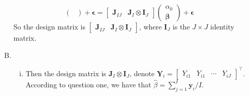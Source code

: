 \documentclass[12pt]{article}
\newcommand{\ttt}[1]{\textbf{#1}}
\begin{document}
\begin{enumerate}
\begin{enumerate}[A.]
$$\begin{pmatrix}
        \end{pmatrix} 
        + \bm{\epsilon}
        = \begin{bmatrix}
            \ttt{J}_{IJ} & \ttt{J}_I \otimes \ttt{I}_J
        \end{bmatrix}
        \begin{pmatrix}
            \alpha_0 \\
            \bm{\beta}
        \end{pmatrix} + \bm{\epsilon}
        $$
        So the design matrix is $\begin{bmatrix} \ttt{J}_{IJ} & \ttt{J}_I \otimes \ttt{I}_J \end{bmatrix}$, where $\ttt{I}_J$ is the $J \times J$ identity matrix.
        \item
        \begin{enumerate}[i.]
            \item
            Then the design matrix is $\ttt{J}_I \otimes \ttt{I}_J$, denote $\ttt{Y}_i = \begin{bmatrix} Y_{i1} & Y_{i1} & \cdots & Y_{iJ} \end{bmatrix}^\top$.
            According to question one, we have that $\hat{\beta} = \sum_{j=1}^{I} \ttt{y}_i / I$.


\end{enumerate}
\end{enumerate}
\end{enumerate}
\end{document}
